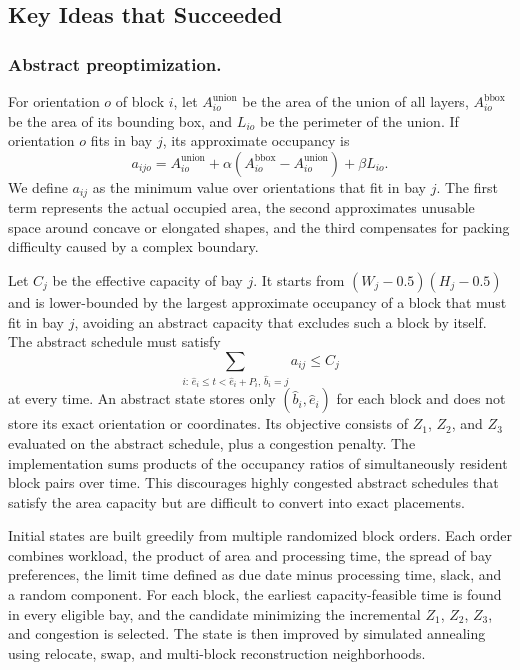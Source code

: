 \documentclass[runningheads]{llncs}
\begin{document}
\subsection{Key Ideas that Succeeded}

\subsubsection{Abstract preoptimization.}
For orientation $o$ of block $i$, let $A^{\mathrm{union}}_{io}$ be the area of the union of all layers, $A^{\mathrm{bbox}}_{io}$ be the area of its bounding box, and $L_{io}$ be the perimeter of the union. If orientation $o$ fits in bay $j$, its approximate occupancy is
\begin{equation}
a_{ijo}=A^{\mathrm{union}}_{io}
+\alpha\left(A^{\mathrm{bbox}}_{io}-A^{\mathrm{union}}_{io}\right)
+\beta L_{io}.
\end{equation}
We define $a_{ij}$ as the minimum value over orientations that fit in bay $j$. The first term represents the actual occupied area, the second approximates unusable space around concave or elongated shapes, and the third compensates for packing difficulty caused by a complex boundary.

Let $C_j$ be the effective capacity of bay $j$. It starts from $(W_j-0.5)(H_j-0.5)$ and is lower-bounded by the largest approximate occupancy of a block that must fit in bay $j$, avoiding an abstract capacity that excludes such a block by itself. The abstract schedule must satisfy
\begin{equation}
\sum_{i:\,\hat e_i\le t<\hat e_i+P_i,\,\hat b_i=j}a_{ij}\le C_j
\end{equation}
at every time. An abstract state stores only $(\hat b_i,\hat e_i)$ for each block and does not store its exact orientation or coordinates. Its objective consists of $Z_1$, $Z_2$, and $Z_3$ evaluated on the abstract schedule, plus a congestion penalty. The implementation sums products of the occupancy ratios of simultaneously resident block pairs over time. This discourages highly congested abstract schedules that satisfy the area capacity but are difficult to convert into exact placements.

Initial states are built greedily from multiple randomized block orders. Each order combines workload, the product of area and processing time, the spread of bay preferences, the limit time defined as due date minus processing time, slack, and a random component. For each block, the earliest capacity-feasible time is found in every eligible bay, and the candidate minimizing the incremental $Z_1$, $Z_2$, $Z_3$, and congestion is selected. The state is then improved by simulated annealing using relocate, swap, and multi-block reconstruction neighborhoods.
\end{document}
